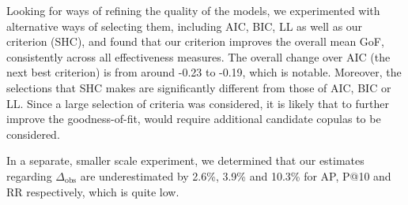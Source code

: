 Looking for ways of refining the quality of the models, we experimented with alternative ways of selecting them, including AIC, BIC, LL as well as our criterion (SHC), and found that our criterion improves the overall mean GoF, consistently across all effectiveness measures. The overall change over AIC (the next best criterion) is from around -0.23 to -0.19, which is notable. Moreover, the selections that SHC makes are significantly different from those of AIC, BIC or LL. Since a large selection of criteria was considered, it is likely that to further improve the goodness-of-fit, would require additional candidate copulas to be considered. 

In a separate, smaller scale experiment, we determined that our estimates regarding $\Delta_{\text{obs}}$ are underestimated by 2.6\%, 3.9\% and 10.3\% for AP, P@10 and RR respectively, which is quite low. 















